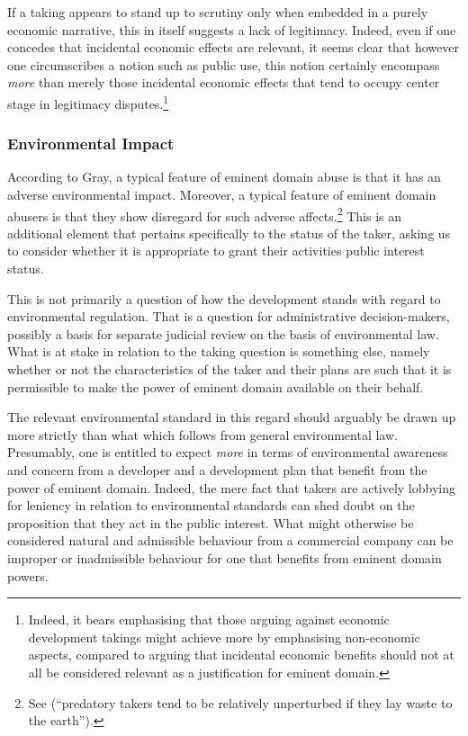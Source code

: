 If a taking appears to stand up to scrutiny only when embedded in a purely economic narrative, this in itself suggests a lack of legitimacy. Indeed, even if one concedes that incidental economic effects are relevant, it seems clear that however one circumscribes a notion such as public use, this notion certainly encompass {\it more} than merely those incidental economic effects that tend to occupy center stage in legitimacy disputes.\footnote{Indeed, it bears emphasising that those arguing against economic development takings might achieve more by emphasising non-economic aspects, compared to arguing that incidental economic benefits should not at all be considered relevant as a justification for eminent domain.}

\subsubsection*{Environmental Impact}

According to Gray, a typical feature of eminent domain abuse is that it has an adverse environmental impact. Moreover, a typical feature of eminent domain abusers is that they show disregard for such adverse affects.\footnote{See \cite[34]{gray11} (``predatory takers tend to be relatively unperturbed if they lay waste to the earth'').} This is an additional element that pertains specifically to the status of the taker, asking us to consider whether it is appropriate to grant their activities public interest status.

This is not primarily a question of how the development stands with regard to environmental regulation. That is a question for administrative decision-makers, possibly a basis for separate judicial review on the basis of environmental law. What is at stake in relation to the taking question is something else, namely whether or not the characteristics of the taker and their plans are such that it is permissible to make the power of eminent domain available on their behalf.

The relevant environmental standard in this regard should arguably be drawn up more strictly than what which follows from general environmental law. Presumably, one is entitled to expect {\it more} in terms of environmental awareness and concern from a developer and a development plan that benefit from the power of eminent domain. Indeed, the mere fact that takers are actively lobbying for leniency in relation to environmental standards can shed doubt on the proposition that they act in the public interest. What might otherwise be considered natural and admissible behaviour from a commercial company can be improper or inadmissible behaviour for one that benefits from eminent domain powers.

